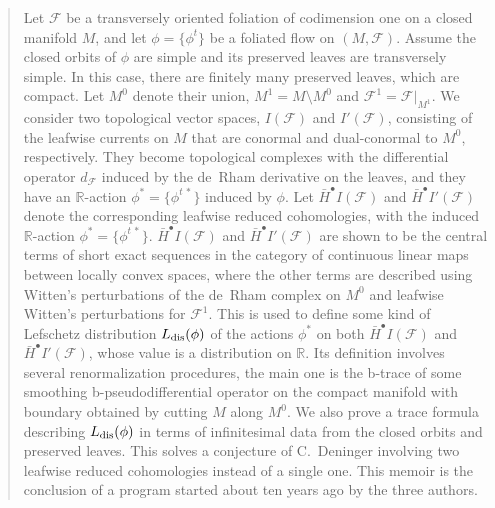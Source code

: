 \documentclass{memo-l}
\theoremstyle{plain}
\theoremstyle{definition}
\theoremstyle{remark}
\numberwithin{section}{chapter}
\numberwithin{equation}{section}%
\begin{document}
\maketitle

\begin{abstract}
Let $\mathcal{F}$ be a transversely oriented foliation of codimension one on a closed manifold $M$, and let $\phi=\{\phi^t\}$ be a foliated flow on $(M,\mathcal{F})$. Assume the closed orbits of $\phi$ are simple and its preserved leaves are transversely simple. In this case, there are finitely many preserved leaves, which are compact. Let $M^0$ denote their union, $M^1=M\setminus M^0$ and $\mathcal{F}^1=\mathcal{F}|_{M^1}$. We consider two topological vector spaces, $I(\mathcal{F})$ and $I'(\mathcal{F})$, consisting of the leafwise currents on $M$ that are conormal and dual-conormal to $M^0$, respectively. They become topological complexes with the differential operator $d_{\mathcal{F}}$ induced by the de~Rham derivative on the leaves, and they have an $\mathbb{R}$-action $\phi^*=\{\phi^{t\,*}\}$ induced by $\phi$. Let $\bar H^\bullet I(\mathcal{F})$ and $\bar H^\bullet I'(\mathcal{F})$ denote the corresponding leafwise reduced cohomologies, with the induced $\mathbb{R}$-action $\phi^*=\{\phi^{t\,*}\}$. $\bar H^\bullet I(\mathcal{F})$ and $\bar H^\bullet I'(\mathcal{F})$ are shown to be the central terms of short exact sequences in the category of continuous linear maps between locally convex spaces, where the other terms are described using Witten's perturbations of the de~Rham complex on $M^0$ and leafwise Witten's perturbations for $\mathcal{F}^1$. This is used to define some kind of Lefschetz distribution $L_{\text{\rm dis}}(\phi)$ of the actions $\phi^*$ on both $\bar H^\bullet I(\mathcal{F})$ and $\bar H^\bullet I'(\mathcal{F})$, whose value is a distribution on $\mathbb{R}$. Its definition involves several renormalization procedures, the main one is the b-trace of some smoothing b-pseudodifferential operator on the compact manifold with boundary obtained by cutting $M$ along $M^0$. We also prove a trace formula describing $L_{\text{\rm dis}}(\phi)$ in terms of infinitesimal data from the closed orbits and preserved leaves. This solves a conjecture of C.~Deninger involving two leafwise reduced cohomologies instead of a single one. This memoir is the conclusion of a program started about ten years ago by the three authors.
\end{abstract}

\tableofcontents

%
\end{document}
